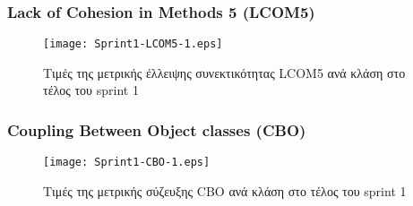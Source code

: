 \subsubsection{Lack of Cohesion in Methods 5 (LCOM5)}
\label{section:sprint1LCOM5}

\begin{figure}
\centering
\texttt{[image: Sprint1-LCOM5-1.eps]}
\caption{Τιμές της μετρικής έλλειψης συνεκτικότητας LCOM5 ανά κλάση στο τέλος του sprint 1}
\label{fig:sprint1LCOM5}
\end{figure}

\subsubsection{Coupling Between Object classes (CBO)}
\label{section:sprint1CBO}

\begin{figure}
\centering
\texttt{[image: Sprint1-CBO-1.eps]}
\caption{Τιμές της μετρικής σύζευξης CBO ανά κλάση στο τέλος του sprint 1}
\label{fig:sprint1CBO}
\end{figure}
